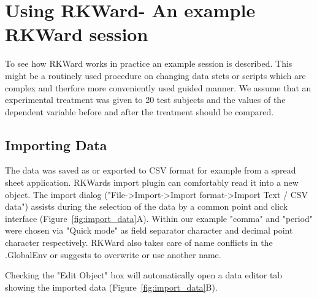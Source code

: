 \section{Using RKWard- An example RKWard session}
\label{sec:using_RKWard}
To see how RKWard works in practice an example session is described.
This might be a routinely used procedure on changing data stets or
 scripts which are complex and therfore
more conveniently used guided manner. We assume that an experimental
treatment was given to 20 test subjects and the values of the dependent
variable before and after the treatment should be compared. 

\subsection{Importing Data}
\label{sec:importing_data}
The data was saved as or exported to CSV format for example from a
spread sheet application. RKWards import plugin can
comfortably read it into a new  object.
The import dialog ("File->Import->Import
format->Import Text / CSV data") assists during the
selection of the data by a common point and click interface (Figure~\ref{fig:import_data}A). Within our
example "comma" and "period" were chosen via "Quick mode" as field
separator character and decimal point character respectively. RKWard
also takes care of name conflicts in the .GlobalEnv or suggests to
overwrite or use another name.


Checking the "Edit Object" box will automatically open a data editor tab
showing the imported data (Figure~\ref{fig:import_data}B).

